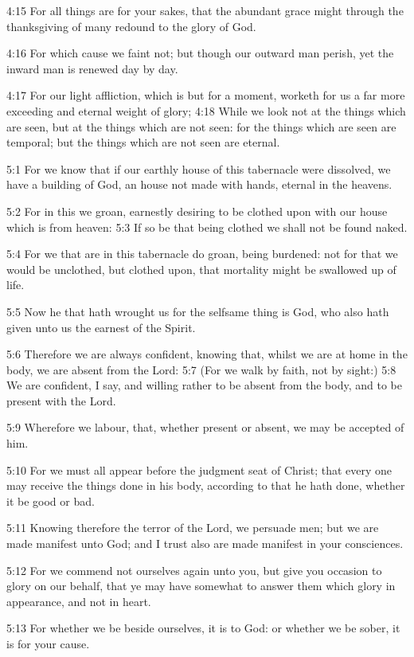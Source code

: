 4:15 For all things are for your sakes, that the abundant grace might through the thanksgiving of many redound to the glory of God.

4:16 For which cause we faint not; but though our outward man perish, yet the inward man is renewed day by day.

4:17 For our light affliction, which is but for a moment, worketh for us a far more exceeding and eternal weight of glory; 4:18 While we look not at the things which are seen, but at the things which are not seen: for the things which are seen are temporal; but the things which are not seen are eternal.

5:1 For we know that if our earthly house of this tabernacle were dissolved, we have a building of God, an house not made with hands, eternal in the heavens.

5:2 For in this we groan, earnestly desiring to be clothed upon with our house which is from heaven: 5:3 If so be that being clothed we shall not be found naked.

5:4 For we that are in this tabernacle do groan, being burdened: not for that we would be unclothed, but clothed upon, that mortality might be swallowed up of life.

5:5 Now he that hath wrought us for the selfsame thing is God, who also hath given unto us the earnest of the Spirit.

5:6 Therefore we are always confident, knowing that, whilst we are at home in the body, we are absent from the Lord: 5:7 (For we walk by faith, not by sight:) 5:8 We are confident, I say, and willing rather to be absent from the body, and to be present with the Lord.

5:9 Wherefore we labour, that, whether present or absent, we may be accepted of him.

5:10 For we must all appear before the judgment seat of Christ; that every one may receive the things done in his body, according to that he hath done, whether it be good or bad.

5:11 Knowing therefore the terror of the Lord, we persuade men; but we are made manifest unto God; and I trust also are made manifest in your consciences.

5:12 For we commend not ourselves again unto you, but give you occasion to glory on our behalf, that ye may have somewhat to answer them which glory in appearance, and not in heart.

5:13 For whether we be beside ourselves, it is to God: or whether we be sober, it is for your cause.

